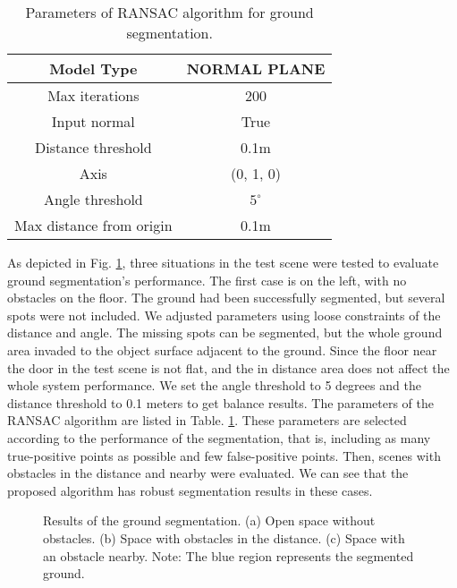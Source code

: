 \documentclass{ieeeaccess}
\begin{document}
\begin{table}[t]
\centering
\caption{Parameters of RANSAC algorithm for ground segmentation.}
\label{tab:ground-segmentation-parameters}
\begin{tabular}{|c|c|}
\hline
Model Type        &  NORMAL PLANE    \\ \hline
Max iterations       &  200    \\ \hline
Input normal        &  True    \\ \hline
Distance threshold        &  0.1m    \\ \hline
Axis       &  (0, 1, 0)    \\ \hline
Angle threshold        &  $5^\circ$    \\ \hline
Max distance from origin        &  0.1m    \\ \hline
\end{tabular}
\end{table}


  As depicted in Fig. \ref{fig:groundsegmentation}, three situations in the test scene were tested to evaluate ground segmentation's performance. The first case is on the left, with no obstacles on the floor. The ground had been successfully segmented, but several spots were not included. We adjusted parameters using loose constraints of the distance and angle. The missing spots can be segmented, but the whole ground area invaded to the object surface adjacent to the ground.  Since the floor near the door in the test scene is not flat, and the in distance area does not affect the whole system performance. We set the angle threshold to 5 degrees and the distance threshold to 0.1 meters to get balance results. The parameters of the RANSAC algorithm are listed in Table. \ref{tab:ground-segmentation-parameters}. These parameters are selected according to the performance of the segmentation, that is, including as many true-positive points as possible and few false-positive points. Then, scenes with obstacles in the distance and nearby were evaluated. We can see that the proposed algorithm has robust segmentation results in these cases. 

\begin{figure}[t]
    \centering
    \caption{Results of the ground segmentation. (a) Open space without obstacles. (b) Space with obstacles in the distance. (c) Space with an obstacle nearby. Note: The blue region represents the segmented ground.}%
    \label{fig:groundsegmentation}
\end{figure}
\end{document}
